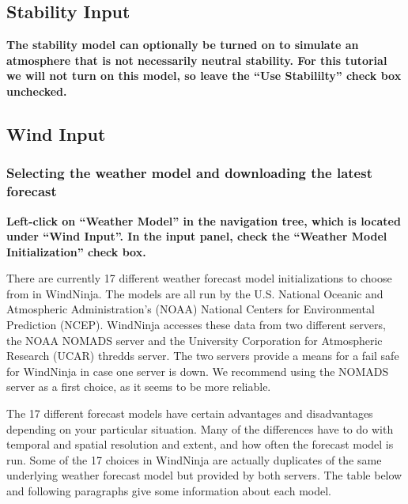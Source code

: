 \documentclass[12pt]{article}
\begin{document}
\subsection{Stability Input}

\textbf{\color{red} The stability model can optionally be turned on to simulate an atmosphere that is not necessarily neutral stability.  For this tutorial we will not turn on this model, so leave the “Use Stabililty” check box unchecked.}

\subsection{Wind Input}

\subsubsection{Selecting the weather model and downloading the latest forecast}

\textbf{\color{red} Left-click on “Weather Model” in the navigation tree, which is located under  “Wind Input”.  In the input panel, check the “Weather Model Initialization” check box.}

There are currently 17 different weather forecast model initializations to choose from in WindNinja.  The models are all run by the U.S. National Oceanic and Atmospheric Administration's (NOAA) National Centers for Environmental Prediction (NCEP).  WindNinja accesses these data from two different servers, the NOAA NOMADS server and the University Corporation for Atmospheric Research (UCAR) thredds server.  The two servers provide a means for a fail safe for WindNinja in case one server is down.  We recommend using the NOMADS server as a first choice, as it seems to be more reliable.

The 17 different forecast models have certain advantages and disadvantages depending on your particular situation.  Many of the differences have to do with temporal and spatial resolution and extent, and how often the forecast model is run.  Some of the 17 choices in WindNinja are actually duplicates of the same underlying weather forecast model but provided by both servers.  The table below and following paragraphs give some information about each model.
\end{document}
